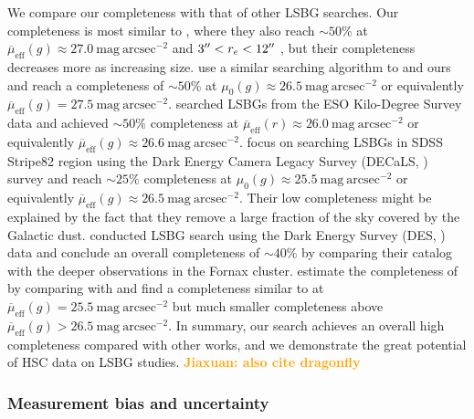 \documentclass[twocolumn,astrosymb,twocolappendix]{aastex631}
\newcommand{\sbunit}{\mathrm{mag\ arcsec}^{-2}}
\newcommand{\sbeff}{\overline{\mu}_{\mathrm{eff}}(g)}
\newcommand{\sbeffr}{\overline{\mu}_{\mathrm{eff}}(r)}
\newcommand{\jiaxuan}[1]{\textcolor{orange}{\textbf{Jiaxuan: #1}}}
\begin{document}
\begin{CJK*}{UTF8}{gbsn}
We compare our completeness with that of other LSBG searches. Our completeness is most similar to , where they also reach $\sim 50\%$ at $\sbeff \approx 27.0\ \sbunit$ and $3\mbox{$^{\prime\prime}$} < r_e < 12\mbox{$^{\prime\prime}$}$ \citep{Kado-Fong2021,Greene2022}, but their completeness decreases more as increasing size. \citet{CarlstenELVES2022} use a similar searching algorithm to  and ours and reach a completeness of $\sim 50\%$ at $\mu_0(g)\approx 26.5\ \sbunit$ or equivalently $\sbeff = 27.5\ \sbunit$. \citet{vdBurg2017} searched LSBGs from the ESO Kilo-Degree Survey data and achieved $\sim 50\%$ completeness at $\sbeffr\approx 26.0\ \sbunit$ or equivalently $\sbeff \approx 26.6\ \sbunit$. \citet{Zaritsky2021} focus on searching LSBGs in SDSS Stripe82 region using the Dark Energy Camera Legacy Survey (DECaLS, \citealt{Dey2019}) survey and reach $\sim 25\%$ completeness at $\mu_{0}(g) \approx 25.5\ \sbunit$ or equivalently $\sbeff \approx 26.5\ \sbunit$. Their low completeness might be explained by the fact that they remove a large fraction of the sky covered by the Galactic dust. \citet{Tanoglidis2021} conducted LSBG search using the Dark Energy Survey (DES, \citealt{Abbot2018}) data and conclude an overall completeness of $\sim 40\%$ by comparing their catalog with the deeper observations in the Fornax cluster. \citet{Kado-Fong2021} estimate the completeness of \citet{Tanoglidis2021} by comparing with  and find a completeness similar to  at $\sbeff = 25.5\ \sbunit$ but much smaller completeness above $\sbeff > 26.5\ \sbunit$. In summary, our search achieves an overall high completeness compared with other works, and we demonstrate the great potential of HSC data on LSBG studies. 
\jiaxuan{also cite dragonfly}

\subsubsection{Measurement bias and uncertainty}\label{sec:meas_unc}




\end{CJK*}
\end{document}
